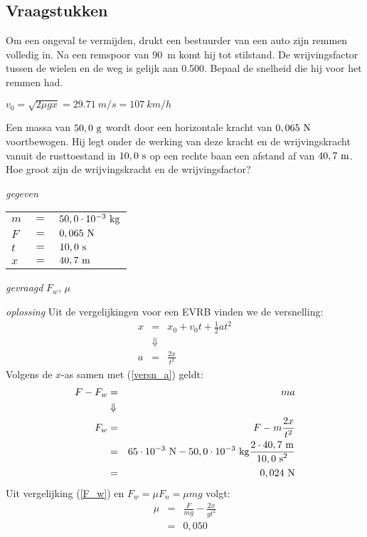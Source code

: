 \documentclass{ximera}
\begin{document}
\subsection{Vraagstukken}


\begin{exercise} Om een ongeval te vermijden, drukt een bestuurder van een auto zijn remmen volledig in. Na een remspoor van \SI{90}{m} komt hij tot stilstand. De wrijvingsfactor tussen de wielen en de weg is gelijk aan \SI{0,500}{}. Bepaal de snelheid die hij voor het remmen had.

\begin{oplossing}
$v_0=\sqrt{2\mu gx}=\SI{29,71}{m/s}=\SI{107}{km/h}$
\end{oplossing}

\end{exercise}

\begin{exercise} Een massa van $50,0~\rm g$ wordt door een horizontale kracht van $0,065~\rm N$ voortbewogen. Hij legt
onder de werking van deze kracht en de wrij\-vings\-kracht vanuit de rusttoestand in $10,0~\rm s$ op een rechte baan een afstand af van $40,7~\rm m$. Hoe groot zijn de wrijvingskracht en de wrijvingsfactor?
\begin{oplossing}
\textit{gegeven}
\begin{tabular}[t]{lcl}
$m$ &$=$& $50,0\cdot10^{-3}~\rm kg$\\
$F$ &$=$& $0,065~\rm N$\\
$t$ &$=$& $10,0~\rm s$\\
$x$ &$=$& $40,7~\rm m$\\
\end{tabular}

\textit{gevraagd}
$F_w$, $\mu$

\textit{oplossing}
Uit de vergelijkingen voor een EVRB vinden we de versnelling:
\begin{eqnarray}
x &=& x_0+v_0t+\frac{1}{2}at^2\nonumber\\
&\Downarrow& \nonumber\\
a &=&\frac{2x}{t^2}\label{versn_a}
\end{eqnarray}
Volgens de $x$-as samen met (\ref{versn_a}) geldt:
\begin{eqnarray}
F-F_w&=&ma\nonumber\\
&\Downarrow& \nonumber\\
F_w &=& F-m\frac{2x}{t^2}\label{F_w}\\
&=& 65\cdot10^{-3}~{\rm N}-50,0\cdot10^{-3}~{\rm kg}\frac{2\cdot40,7~{\rm m}}{{10,0~{\rm s}}^2}\nonumber\\
&=& 0,024~\rm N\nonumber
\end{eqnarray}
Uit vergelijking (\ref{F_w}) en $F_w=\mu F_n=\mu mg$ volgt:
\begin{eqnarray*}
\mu &=& \frac{F}{mg}-\frac{2x}{gt^2}\\
&=& 0,050
\end{eqnarray*}
\end{oplossing}

\end{exercise}
\end{document}
